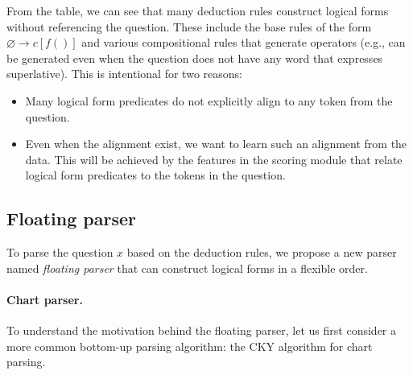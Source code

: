 From the table,
we can see that many deduction rules
construct logical forms
without referencing the question.
These include the base rules of the form
$\varnothing \to c[f()]$
and various compositional rules
that generate operators
(e.g.,  can be generated even when
the question does not have any word that expresses superlative).
This is intentional for two reasons:
\begin{itemize}
\item Many logical form predicates do not explicitly align
to any token from the question.
\item Even when the alignment exist, we want to learn
such an alignment from the data.
This will be achieved by the features in the scoring module
that relate logical form predicates to the tokens in the question.
\end{itemize}

\subsection{Floating parser}\label{sec:floating-parser}
To parse the question $x$ based on the deduction rules,
we propose a new parser named \emph{floating parser}
that can construct logical forms in a flexible order.

\paragraph{Chart parser.}
To understand the motivation behind the floating parser,
let us first consider a more common bottom-up parsing algorithm:
the CKY algorithm for chart parsing.


